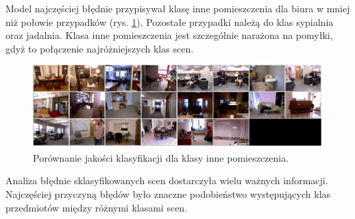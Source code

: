 Model najczęściej błędnie przypisywał klasę inne pomieszczenia dla biura w mniej niż połowie przypadków (rys. \ref{fig:oter_indoor-false-pred}). Pozostałe przypadki należą do klas sypialnia oraz jadalnia. Klasa inne pomieszczenia jest szczególnie narażona na pomyłki, gdyż to połączenie najróżniejszych klas scen.
\begin{figure}[ht!]
    \centering
    \includegraphics[width=\textwidth]{img/preds_analysis/classification/other_indoor-2.png}
    \caption{Porównanie jakości klasyfikacji dla klasy inne pomieszczenia.}
    \label{fig:oter_indoor-false-pred}
\end{figure}


Analiza błędnie sklasyfikowanych scen dostarczyła wielu ważnych informacji. Najczęściej przyczyną błędów było znaczne podobieństwo występujących klas przedmiotów między różnymi klasami scen.


    
    
    
